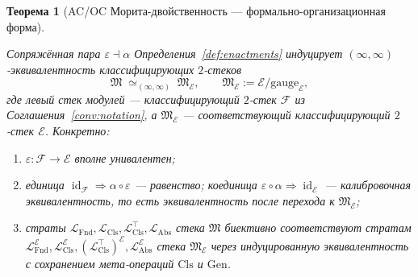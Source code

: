 \documentclass[11pt]{article}
\theoremstyle{plain}
\newtheorem{theorem}{Теорема}[section]
\theoremstyle{definition}
\newcommand{\cF}{\mathcal{F}}
\newcommand{\fM}{\mathfrak{M}}
\newcommand{\LFnd}{\mathcal{L}_{\mathrm{Fnd}}}
\newcommand{\LCls}{\mathcal{L}_{\mathrm{Cls}}}
\newcommand{\LClsMax}{\mathcal{L}_{\mathrm{Cls}}^{\top}}
\newcommand{\LAbs}{\mathcal{L}_{\mathrm{Abs}}}
\newcommand{\cE}{\mathcal{E}}
\DeclareMathOperator{\id}{id}
\begin{document}
\begin{theorem}[AC/OC Морита-двойственность --- формально-организационная форма]\label{thm:ac-oc-duality}

Сопряжённая пара $\varepsilon \dashv \alpha$ Определения~\ref{def:enactments} индуцирует $(\infty, \infty)$-эквивалентность классифицирующих $2$-стеков
\[
  \fM \;\simeq_{(\infty, \infty)}\; \fM_\cE, \qquad \fM_\cE := \cE / \mathrm{gauge}_\cE,
\]
где левый стек модулей — классифицирующий $2$-стек $\cF$ из Соглашения~\ref{conv:notation}, а $\fM_\cE$ — соответствующий классифицирующий $2$-стек $\cE$. Конкретно:
\begin{enumerate}[label=(\alph*)]
\item $\varepsilon : \cF \to \cE$ вполне унивалентен;
\item единица $\id_\cF \Rightarrow \alpha \circ \varepsilon$ — равенство; коединица $\varepsilon \circ \alpha \Rightarrow \id_\cE$ — калибровочная эквивалентность, то есть эквивалентность после перехода к $\fM_\cE$;
\item страты $\LFnd, \LCls, \LClsMax, \LAbs$ стека $\fM$ биективно соответствуют стратам $\LFnd^\cE, \LCls^\cE, (\LClsMax)^\cE, \LAbs^\cE$ стека $\fM_\cE$ через индуцированную эквивалентность с сохранением мета-операций $\mathrm{Cls}$ и $\mathrm{Gen}$.
\end{enumerate}
\end{theorem}
\end{document}
